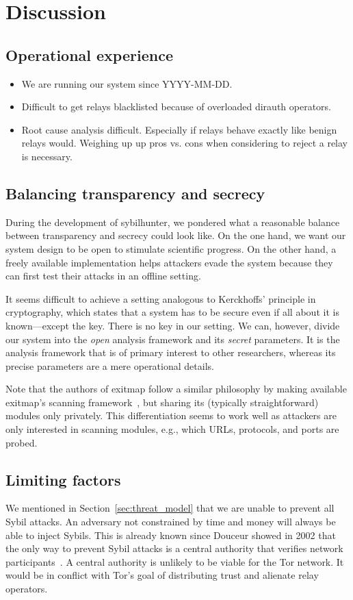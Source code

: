 \section{Discussion}
\label{sec:discussion}

\subsection{Operational experience}
\label{sec:operational}
\begin{itemize}
	\item We are running our system since YYYY-MM-DD.
	\item Difficult to get relays blacklisted because of overloaded dirauth operators.
	\item Root cause analysis difficult.  Especially if relays behave exactly
		like benign relays would.  Weighing up up pros vs. cons when
		considering to reject a relay is necessary.
\end{itemize}

\subsection{Balancing transparency and secrecy}
\label{sec:secrecy}
During the development of sybilhunter, we pondered what a reasonable balance
between transparency and secrecy could look like.  On the one hand, we want our
system design to be open to stimulate scientific progress.  On the other hand,
a freely available implementation helps attackers evade the system because they
can first test their attacks in an offline setting.

It seems difficult to achieve a setting analogous to Kerckhoffs' principle in
cryptography, which states that a system has to be secure even if all about it
is known---except the key.  There is no key in our setting.  We can, however,
divide our system into the \emph{open} analysis framework and its \emph{secret}
parameters.  It is the analysis framework that is of primary interest to other
researchers, whereas its precise parameters are a mere operational details.

Note that the authors of exitmap follow a similar philosophy by making
available exitmap's scanning framework~\cite{exitmap}, but sharing its
(typically straightforward) modules only privately.  This differentiation seems
to work well as attackers are only interested in scanning modules, e.g., which
URLs, protocols, and ports are probed.

\subsection{Limiting factors}
We mentioned in Section~\ref{sec:threat_model} that we are unable to prevent
all Sybil attacks.  An adversary not constrained by time and money will always
be able to inject Sybils.  This is already known since Douceur showed in 2002
that the only way to prevent Sybil attacks is a central authority that verifies
network participants~\cite{Douceur2002a}.  A central authority is unlikely to
be viable for the Tor network.  It would be in conflict with Tor's goal of
distributing trust and alienate relay operators.

